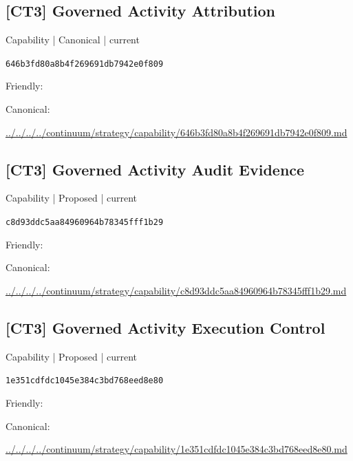 \documentclass[10pt,a4paper]{article}
\begin{document}
\subsection*{[CT3] Governed Activity Attribution}
{\small Capability | Canonical | current}\par
\texttt{646b3fd80a8b4f269691db7942e0f809}\par
Friendly: \par
Canonical: \par
{\footnotesize\url{../../../../continuum/strategy/capability/646b3fd80a8b4f269691db7942e0f809.md}}\par
\subsection*{[CT3] Governed Activity Audit Evidence}
{\small Capability | Proposed | current}\par
\texttt{c8d93ddc5aa84960964b78345fff1b29}\par
Friendly: \par
Canonical: \par
{\footnotesize\url{../../../../continuum/strategy/capability/c8d93ddc5aa84960964b78345fff1b29.md}}\par
\subsection*{[CT3] Governed Activity Execution Control}
{\small Capability | Proposed | current}\par
\texttt{1e351cdfdc1045e384c3bd768eed8e80}\par
Friendly: \par
Canonical: \par
{\footnotesize\url{../../../../continuum/strategy/capability/1e351cdfdc1045e384c3bd768eed8e80.md}}\par
\end{document}
